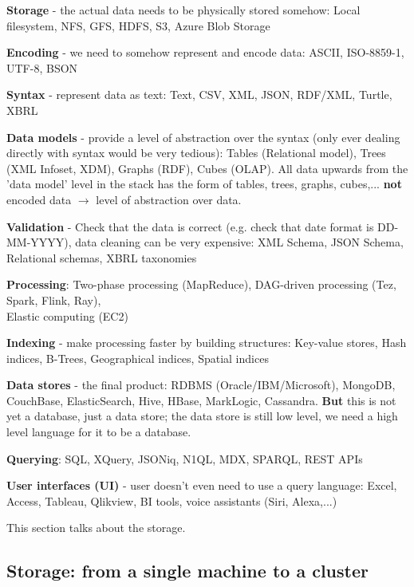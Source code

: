 \documentclass[11pt,oneside,a4paper]{article}
\begin{document}
\begin{compactitem}
	\item \textbf{Storage} - the actual data needs to be physically stored somehow: Local filesystem, NFS, GFS, HDFS, S3, Azure Blob Storage
	\item \textbf{Encoding} - we need to somehow represent and encode data: ASCII, ISO-8859-1, UTF-8, BSON
	\item \textbf{Syntax} - represent data as text: Text, CSV, XML, JSON, RDF/XML, Turtle, XBRL
	\item \textbf{Data models} - provide a level of abstraction over the syntax (only ever dealing directly with syntax would be very tedious):	Tables (Relational model), Trees (XML Infoset, XDM), Graphs (RDF), Cubes (OLAP). All data upwards from the 'data model' level in the stack has the form of tables, trees, graphs, cubes,... \textbf{not} encoded data $\rightarrow$ level of abstraction over data.
	\item \textbf{Validation} - Check that the data is correct (e.g. check that date format is DD-MM-YYYY), data cleaning can be very expensive: XML Schema, JSON Schema, Relational schemas, XBRL taxonomies
	\item \textbf{Processing}: Two-phase processing (MapReduce), DAG-driven processing (Tez, Spark, Flink, Ray),\\ Elastic computing (EC2)
	\item \textbf{Indexing} - make processing faster by building structures: Key-value stores, Hash indices, B-Trees, Geographical indices, Spatial indices
	\item \textbf{Data stores} - the final product: RDBMS (Oracle/IBM/Microsoft), MongoDB, CouchBase, ElasticSearch, Hive, HBase, MarkLogic, Cassandra. \textbf{But} this is not yet a database, just a data store; the data store is still low level, we need a high level language for it to be a database.
	\item \textbf{Querying}: SQL, XQuery, JSONiq, N1QL, MDX, SPARQL, REST APIs
	\item \textbf{User interfaces (UI)} - user doesn't even need to use a query language: Excel,	Access,	Tableau, Qlikview, BI tools, voice assistants (Siri, Alexa,...)
\end{compactitem}

This section talks about the storage.


\subsection{Storage: from a single machine to a cluster}
\end{document}
